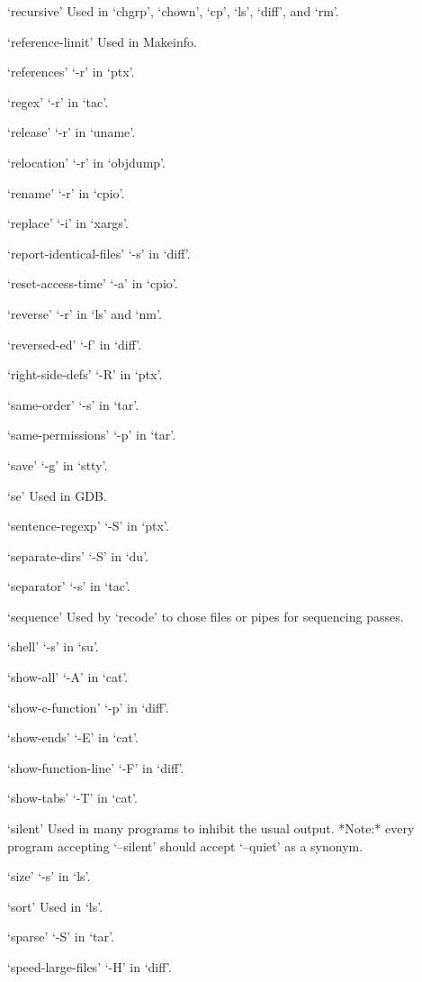 `recursive'
     Used in `chgrp', `chown', `cp', `ls', `diff', and `rm'.

`reference-limit'
     Used in Makeinfo.

`references'
     `-r' in `ptx'.

`regex'
     `-r' in `tac'.

`release'
     `-r' in `uname'.

`relocation'
     `-r' in `objdump'.

`rename'
     `-r' in `cpio'.

`replace'
     `-i' in `xargs'.

`report-identical-files'
     `-s' in `diff'.

`reset-access-time'
     `-a' in `cpio'.

`reverse'
     `-r' in `ls' and `nm'.

`reversed-ed'
     `-f' in `diff'.

`right-side-defs'
     `-R' in `ptx'.

`same-order'
     `-s' in `tar'.

`same-permissions'
     `-p' in `tar'.

`save'
     `-g' in `stty'.

`se'
     Used in GDB.

`sentence-regexp'
     `-S' in `ptx'.

`separate-dirs'
     `-S' in `du'.

`separator'
     `-s' in `tac'.

`sequence'
     Used by `recode' to chose files or pipes for sequencing passes.

`shell'
     `-s' in `su'.

`show-all'
     `-A' in `cat'.

`show-c-function'
     `-p' in `diff'.

`show-ends'
     `-E' in `cat'.

`show-function-line'
     `-F' in `diff'.

`show-tabs'
     `-T' in `cat'.

`silent'
     Used in many programs to inhibit the usual output.  *Note:* every
     program accepting `--silent' should accept `--quiet' as a synonym.

`size'
     `-s' in `ls'.

`sort'
     Used in `ls'.

`sparse'
     `-S' in `tar'.

`speed-large-files'
     `-H' in `diff'.

